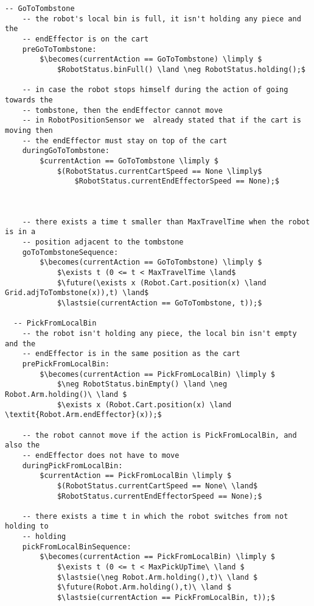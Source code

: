 \begin{lstlisting}[fontadjust, mathescape, frame=single]
  -- GoToTombstone
    -- the robot's local bin is full, it isn't holding any piece and the 
    -- endEffector is on the cart
    preGoToTombstone:
        $\becomes(currentAction == GoToTombstone) \limply $
            $RobotStatus.binFull() \land \neg RobotStatus.holding();$
    
    -- in case the robot stops himself during the action of going towards the 
    -- tombstone, then the endEffector cannot move 
    -- in RobotPositionSensor we  already stated that if the cart is moving then 
    -- the endEffector must stay on top of the cart
    duringGoToTombstone:
        $currentAction == GoToTombstone \limply $
            $(RobotStatus.currentCartSpeed == None \limply$ 
                $RobotStatus.currentEndEffectorSpeed == None);$



    -- there exists a time t smaller than MaxTravelTime when the robot is in a 
    -- position adjacent to the tombstone
    goToTombstoneSequence:
        $\becomes(currentAction == GoToTombstone) \limply $
            $\exists t (0 <= t < MaxTravelTime \land$
            $\future(\exists x (Robot.Cart.position(x) \land Grid.adjToTombstone(x)),t) \land$
            $\lastsie(currentAction == GoToTombstone, t));$

  -- PickFromLocalBin
    -- the robot isn't holding any piece, the local bin isn't empty and the 
    -- endEffector is in the same position as the cart
    prePickFromLocalBin:
        $\becomes(currentAction == PickFromLocalBin) \limply $
            $\neg RobotStatus.binEmpty() \land \neg Robot.Arm.holding()\ \land $
            $\exists x (Robot.Cart.position(x) \land \textit{Robot.Arm.endEffector}(x));$
    
    -- the robot cannot move if the action is PickFromLocalBin, and also the 
    -- endEffector does not have to move
    duringPickFromLocalBin:
        $currentAction == PickFromLocalBin \limply $
            $(RobotStatus.currentCartSpeed == None\ \land$
            $RobotStatus.currentEndEffectorSpeed == None);$
  
    -- there exists a time t in which the robot switches from not holding to 
    -- holding
    pickFromLocalBinSequence:
        $\becomes(currentAction == PickFromLocalBin) \limply $
            $\exists t (0 <= t < MaxPickUpTime\ \land $
            $\lastsie(\neg Robot.Arm.holding(),t)\ \land $
            $\future(Robot.Arm.holding(),t)\ \land $
            $\lastsie(currentAction == PickFromLocalBin, t));$


\end{lstlisting}

